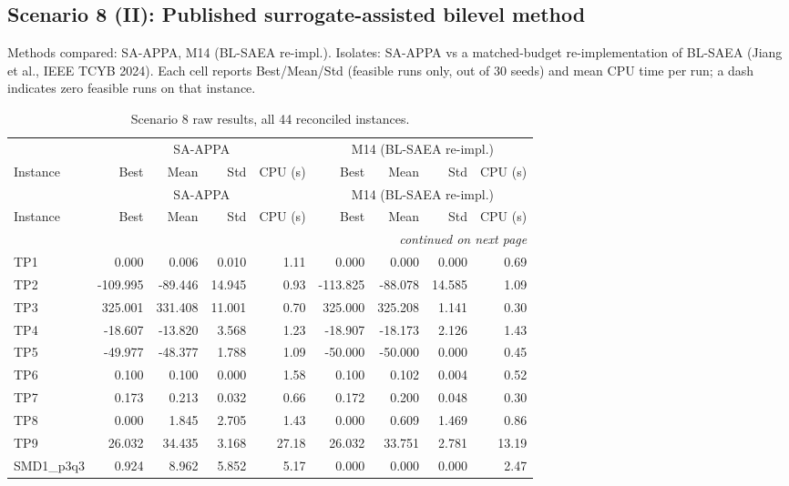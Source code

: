 \subsection{Scenario 8 (II): Published surrogate-assisted bilevel method}
\label{app:scenario8}
Methods compared: SA-APPA, M14 (BL-SAEA re-impl.). Isolates: SA-APPA vs a matched-budget re-implementation of BL-SAEA (Jiang et al., IEEE TCYB 2024). Each cell reports Best/Mean/Std (feasible runs only, out of 30 seeds) and mean CPU time per run; a dash indicates zero feasible runs on that instance.

\begingroup\scriptsize
\begin{longtable}{lrrrrrrrr}
\caption{Scenario 8 raw results, all 44 reconciled instances.}\label{tab:scenario8}\\
\toprule
 & \multicolumn{4}{c}{SA-APPA} & \multicolumn{4}{c}{M14 (BL-SAEA re-impl.)} \\
\cmidrule(lr){2-5} \cmidrule(lr){6-9}
Instance & Best & Mean & Std & CPU (s) & Best & Mean & Std & CPU (s) \\
\midrule
\endfirsthead
\toprule
 & \multicolumn{4}{c}{SA-APPA} & \multicolumn{4}{c}{M14 (BL-SAEA re-impl.)} \\
\cmidrule(lr){2-5} \cmidrule(lr){6-9}
Instance & Best & Mean & Std & CPU (s) & Best & Mean & Std & CPU (s) \\
\midrule
\endhead
\midrule\multicolumn{9}{r}{\emph{continued on next page}}\\\midrule
\endfoot
\bottomrule
\endlastfoot
TP1 & 0.000 & 0.006 & 0.010 & 1.11 & 0.000 & 0.000 & 0.000 & 0.69 \\
TP2 & -109.995 & -89.446 & 14.945 & 0.93 & -113.825 & -88.078 & 14.585 & 1.09 \\
TP3 & 325.001 & 331.408 & 11.001 & 0.70 & 325.000 & 325.208 & 1.141 & 0.30 \\
TP4 & -18.607 & -13.820 & 3.568 & 1.23 & -18.907 & -18.173 & 2.126 & 1.43 \\
TP5 & -49.977 & -48.377 & 1.788 & 1.09 & -50.000 & -50.000 & 0.000 & 0.45 \\
TP6 & 0.100 & 0.100 & 0.000 & 1.58 & 0.100 & 0.102 & 0.004 & 0.52 \\
TP7 & 0.173 & 0.213 & 0.032 & 0.66 & 0.172 & 0.200 & 0.048 & 0.30 \\
TP8 & 0.000 & 1.845 & 2.705 & 1.43 & 0.000 & 0.609 & 1.469 & 0.86 \\
TP9 & 26.032 & 34.435 & 3.168 & 27.18 & 26.032 & 33.751 & 2.781 & 13.19 \\
SMD1\_p3q3 & 0.924 & 8.962 & 5.852 & 5.17 & 0.000 & 0.000 & 0.000 & 2.47 \\

\end{longtable}
